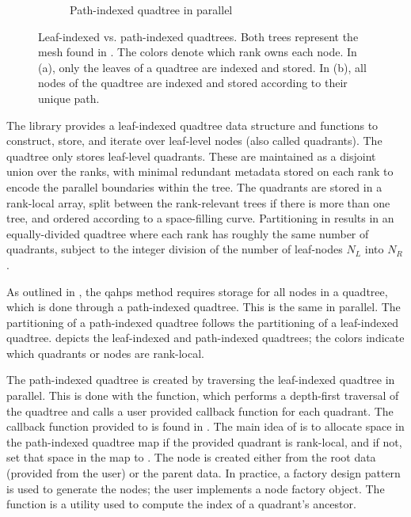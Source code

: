 \begin{figure}
\begin{subfigure}[t]{1\textwidth}
        \caption{Path-indexed quadtree in parallel}
    \end{subfigure}
    \caption{Leaf-indexed vs. path-indexed quadtrees. Both trees represent the mesh found in . The colors denote which rank owns each node. In (a), only the leaves of a quadtree are indexed and stored. In (b), all nodes of the quadtree are indexed and stored according to their unique path.}
    \label{fig:quadtree_indexing}
\end{figure}

The \pforest library provides a leaf-indexed quadtree data structure and functions to construct, store, and iterate over leaf-level nodes (also called quadrants). The \pforest quadtree only stores leaf-level quadrants. These are maintained as a disjoint union over the ranks, with minimal redundant metadata stored on each rank to encode the parallel boundaries within the tree. The quadrants are stored in a rank-local array, split between the rank-relevant trees if there is more than one tree, and ordered according to a space-filling curve. Partitioning in \pforest results in an equally-divided quadtree where each rank has roughly the same number of quadrants, subject to the integer division of the number of leaf-nodes $N_{L}$ into $N_{R}$.

As outlined in , the \gls{qahps} method requires storage for all nodes in a quadtree, which is done through a path-indexed quadtree. This is the same in parallel. The partitioning of a path-indexed quadtree follows the partitioning of a leaf-indexed quadtree.  depicts the leaf-indexed and path-indexed quadtrees; the colors indicate which quadrants or nodes are rank-local.

The path-indexed quadtree is created by traversing the leaf-indexed quadtree in parallel. This is done with the  function, which performs a depth-first traversal of the quadtree and calls a user provided callback function for each quadrant. The callback function provided to  is found in . The main idea of  is to allocate space in the path-indexed quadtree map if the provided quadrant is rank-local, and if not, set that space in the map to . The node is created either from the root data (provided from the user) or the parent data. In practice, a factory design pattern is used to generate the nodes; the user implements a node factory object. The function  is a utility used to compute the index of a quadrant's ancestor.

